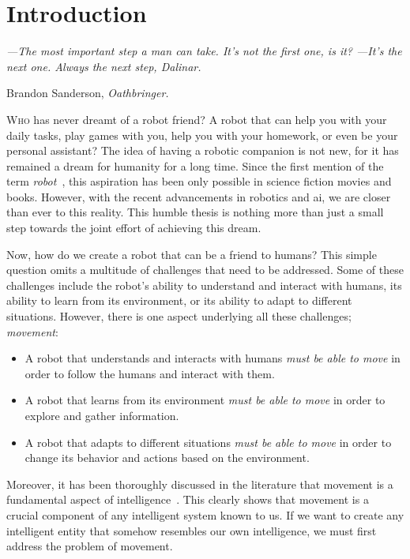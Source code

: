 \usepackage{acronym}\chapter{Introduction}\label{ch:introduction}

\setlength{}
\epigraph{\itshape ---The most important step a man can take.
It's not the first one, is it?
---It's the next one.
Always the next step, Dalinar.}{Brandon Sanderson, \textit{Oathbringer.}}

\lettrine{\textcolor{accent_color}{W}}{ho} has never dreamt of a robot friend?
A robot that can help you with your daily tasks, play games with you, help you with your homework, or even be your personal assistant?
The idea of having a robotic companion is not new, for it has remained a dream for humanity for a long time.
Since the first mention of the term \textit{robot}~\cite{robot1920}, this aspiration has been only possible in science fiction movies and books.
However, with the recent advancements in robotics and \acrfull{ai}, we are closer than ever to this reality.
This humble thesis is nothing more than just a small step towards the joint effort of achieving this dream.

Now, how do we create a robot that can be a friend to humans?
This simple question omits a multitude of challenges that need to be addressed.
Some of these challenges include the robot's ability to understand and interact with humans, its ability to learn from its environment, or its ability to adapt to different situations.
However, there is one aspect underlying all these challenges; \textit{movement}:

\begin{itemize}
    \item A robot that understands and interacts with humans \textit{must be able to move} in order to follow the humans and interact with them.
    \item A robot that learns from its environment \textit{must be able to move} in order to explore and gather information.
    \item A robot that adapts to different situations \textit{must be able to move} in order to change its behavior and actions based on the environment.
\end{itemize}

Moreover, it has been thoroughly discussed in the literature that movement is a fundamental aspect of intelligence~\cite{Darwin1871, Arbib2005, Leisman2016, Wolpert2011, Llinas2001}.
This clearly shows that movement is a crucial component of any intelligent system known to us.
If we want to create any intelligent entity that somehow resembles our own intelligence, we must first address the problem of movement.

